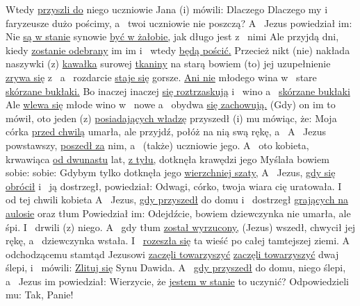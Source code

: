  Wtedy \underline{przyszli do} niego uczniowie Jana (i) mówili: Dlaczego Dlaczego my i~ faryzeusze dużo pościmy, a~ twoi uczniowie nie poszczą?
 A~ Jezus powiedział im: Nie \underline{są w stanie} synowie  \underline{być w żałobie,} jak długo jest z~ nimi  Ale przyjdą dni, kiedy \underline{zostanie odebrany} im im  i~ wtedy \underline{będą pościć.}
 Przecież nikt (nie) nakłada naszywki (z) \underline{kawałka} surowej \underline{tkaniny} na starą  bowiem (to) jej uzupełnienie \underline{zrywa się} z~  a~ rozdarcie \underline{staje się} gorsze.
 \underline{Ani nie}  młodego wina w~ stare \underline{skórzane bukłaki.} Bo inaczej inaczej  \underline{się roztrzaskują} i~ wino  a~ \underline{skórzane bukłaki}  Ale \underline{wlewa się} młode wino w~ nowe  a~ obydwa \underline{się zachowują.}
 (Gdy) on im to mówił, oto jeden (z) \underline{posiadających władzę} przyszedł (i)  mu  mówiąc, że: Moja córka \underline{przed chwilą} umarła, ale przyjdź, połóż na nią swą rękę, a~ 
 A~ Jezus powstawszy, \underline{poszedł za} nim, a~ (także) uczniowie jego.
 A~ oto kobieta, krwawiąca \underline{od dwunastu} lat,  \underline{z tyłu,} dotknęła krawędzi jego 
 Myślała bowiem sobie: sobie: Gdybym tylko dotknęła jego \underline{wierzchniej szaty,} 
 A~ Jezus, \underline{gdy się obrócił} i~ ją dostrzegł, powiedział: Odwagi, córko, twoja wiara cię uratowała. I~ od tej chwili kobieta 
 A~ Jezus, \underline{gdy przyszedł} do domu  i~ dostrzegł \underline{grających na aulosie} oraz tłum 
 Powiedział im: Odejdźcie, bowiem dziewczynka nie umarła, ale śpi. I~ drwili (z) niego.
 A~ gdy tłum \underline{został wyrzucony,} (Jezus) wszedł, chwycił jej rękę, a~ dziewczynka wstała.
 I~ \underline{rozeszła się} ta wieść po całej tamtejszej ziemi.
 A~ odchodzącemu stamtąd Jezusowi \underline{zaczęli towarzyszyć} \underline{zaczęli towarzyszyć} dwaj ślepi,  i~ mówili: \underline{Zlituj się}  Synu Dawida.
 A~ \underline{gdy przyszedł} do domu,  niego ślepi, a~ Jezus im powiedział: Wierzycie, że \underline{jestem w stanie} to uczynić? Odpowiedzieli mu: Tak, Panie!
